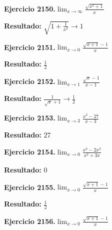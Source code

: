\documentclass[10pt,a4paper]{article}
\begin{document}
\newpage
\begin{ejbox}
\textbf{Ejercicio 2150.}\quad $\lim_{x\to \infty} \frac{\sqrt{x^2+1}}{x}$
\end{ejbox}

\begin{solbox}
\textbf{Resultado:} \(\displaystyle \sqrt{1+\frac{1}{x^2}} \to 1\)
\end{solbox}

\begin{ejbox}
\textbf{Ejercicio 2151.}\quad $\lim_{x\to 0} \frac{\sqrt{x+1}-1}{x}$
\end{ejbox}

\begin{solbox}
\textbf{Resultado:} \(\displaystyle \frac{1}{2}\)
\end{solbox}

\begin{ejbox}
\textbf{Ejercicio 2152.}\quad $\lim_{x\to 1} \frac{\sqrt{x}-1}{x-1}$
\end{ejbox}

\begin{solbox}
\textbf{Resultado:} \(\displaystyle \frac{1}{\sqrt{x}+1} \to \frac{1}{2}\)
\end{solbox}

\newpage
\begin{ejbox}
\textbf{Ejercicio 2153.}\quad $\lim_{x\to 3} \frac{x^3-27}{x-3}$
\end{ejbox}

\begin{solbox}
\textbf{Resultado:} \(\displaystyle 27\)
\end{solbox}

\begin{ejbox}
\textbf{Ejercicio 2154.}\quad $\lim_{x\to 0} \frac{x^3-2x^2}{x^2+3x}$
\end{ejbox}

\begin{solbox}
\textbf{Resultado:} \(\displaystyle 0\)
\end{solbox}

\begin{ejbox}
\textbf{Ejercicio 2155.}\quad $\lim_{x\to 0} \frac{\sqrt{x+1}-1}{x}$
\end{ejbox}

\begin{solbox}
\textbf{Resultado:} \(\displaystyle \frac{1}{2}\)
\end{solbox}

\newpage
\begin{ejbox}
\textbf{Ejercicio 2156.}\quad $\lim_{x\to 0} \frac{\sqrt{x+1}-1}{x}$
\end{ejbox}
\end{document}
